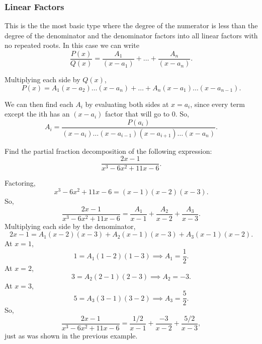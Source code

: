 \subsubsection{Linear Factors}
\noindent
This is the the most basic type where the degree of the numerator is less than the degree of the denominator and the denominator factors into all linear factors with no repeated roots. In this case we can write
\begin{equation*}
	\frac{P(x)}{Q(x)} = \frac{A_1}{(x-a_1)} + \ldots + \frac{A_n}{(x-a_n)}.
\end{equation*}

\noindent
Multiplying each side by $Q(x)$,
\begin{equation*}
	P(x) = A_1(x-a_2) \ldots (x-a_n) + \ldots + A_n(x-a_1) \ldots (x-a_{n-1}).
\end{equation*}

\noindent
We can then find each $A_i$ by evaluating both sides at $x=a_i$, since every term except the ith has an $(x-a_i)$ factor that will go to 0. So,
\begin{equation*}
	A_i = \frac{P(a_i)}{(x-a_i) \ldots (x-a_{i-1})(x-a_{i+1}) \ldots (x-a_n)}.
\end{equation*}

\begin{example}
	Find the partial fraction decomposition of the following expression:
	\begin{equation*}
		\frac{2x-1}{x^3-6x^2+11x-6}.
	\end{equation*}
\end{example}
\begin{answer}
	Factoring,
	\begin{equation*}
		x^3 - 6x^2 + 11x - 6 = (x-1)(x-2)(x-3).
	\end{equation*}
	So,
	\begin{equation*}
		\frac{2x-1}{x^3-6x^2+11x-6} = \frac{A_1}{x-1}+\frac{A_2}{x-2}+\frac{A_3}{x-3}.
	\end{equation*}
	Multiplying each side by the denominator,
	\begin{equation*}
		2x-1 = A_1(x-2)(x-3)+A_2(x-1)(x-3)+A_3(x-1)(x-2).
	\end{equation*}
	At $x=1$,
	\begin{equation*}
		1 = A_1(1-2)(1-3) \implies A_1 = \frac{1}{2}.
	\end{equation*}
	At $x=2$,
	\begin{equation*}
		3 = A_2(2-1)(2-3) \implies A_2 = -3.
	\end{equation*}
	At $x=3$,
	\begin{equation*}
		5 = A_3(3-1)(3-2) \implies A_3 = \frac{5}{2}.
	\end{equation*}
	So,
	\begin{equation*}
		\frac{2x-1}{x^3-6x^2+11x-6} = \frac{1/2}{x-1} + \frac{-3}{x-2} + \frac{5/2}{x-3},
	\end{equation*}
	just as was shown in the previous example.
\end{answer}